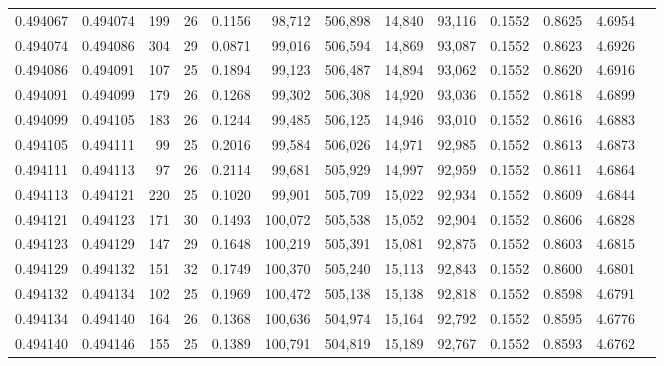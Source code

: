 \begin{tabular}{rrrrrrrrrrrrr}
0.494067 & 0.494074 & 199 &  26 &                                     0.1156 &  98,712 & 506,898 &  14,840 &  93,116 & 0.1552 & 0.8625 & 4.6954 \\
0.494074 & 0.494086 & 304 &  29 &                                     0.0871 &  99,016 & 506,594 &  14,869 &  93,087 & 0.1552 & 0.8623 & 4.6926 \\
0.494086 & 0.494091 & 107 &  25 &                                     0.1894 &  99,123 & 506,487 &  14,894 &  93,062 & 0.1552 & 0.8620 & 4.6916 \\
0.494091 & 0.494099 & 179 &  26 &                                     0.1268 &  99,302 & 506,308 &  14,920 &  93,036 & 0.1552 & 0.8618 & 4.6899 \\
0.494099 & 0.494105 & 183 &  26 &                                     0.1244 &  99,485 & 506,125 &  14,946 &  93,010 & 0.1552 & 0.8616 & 4.6883 \\
0.494105 & 0.494111 &  99 &  25 &                                     0.2016 &  99,584 & 506,026 &  14,971 &  92,985 & 0.1552 & 0.8613 & 4.6873 \\
0.494111 & 0.494113 &  97 &  26 &                                     0.2114 &  99,681 & 505,929 &  14,997 &  92,959 & 0.1552 & 0.8611 & 4.6864 \\
0.494113 & 0.494121 & 220 &  25 &                                     0.1020 &  99,901 & 505,709 &  15,022 &  92,934 & 0.1552 & 0.8609 & 4.6844 \\
0.494121 & 0.494123 & 171 &  30 &                                     0.1493 & 100,072 & 505,538 &  15,052 &  92,904 & 0.1552 & 0.8606 & 4.6828 \\
0.494123 & 0.494129 & 147 &  29 &                                     0.1648 & 100,219 & 505,391 &  15,081 &  92,875 & 0.1552 & 0.8603 & 4.6815 \\
0.494129 & 0.494132 & 151 &  32 &                                     0.1749 & 100,370 & 505,240 &  15,113 &  92,843 & 0.1552 & 0.8600 & 4.6801 \\
0.494132 & 0.494134 & 102 &  25 &                                     0.1969 & 100,472 & 505,138 &  15,138 &  92,818 & 0.1552 & 0.8598 & 4.6791 \\
0.494134 & 0.494140 & 164 &  26 &                                     0.1368 & 100,636 & 504,974 &  15,164 &  92,792 & 0.1552 & 0.8595 & 4.6776 \\
0.494140 & 0.494146 & 155 &  25 &                                     0.1389 & 100,791 & 504,819 &  15,189 &  92,767 & 0.1552 & 0.8593 & 4.6762 \\

\end{tabular}
